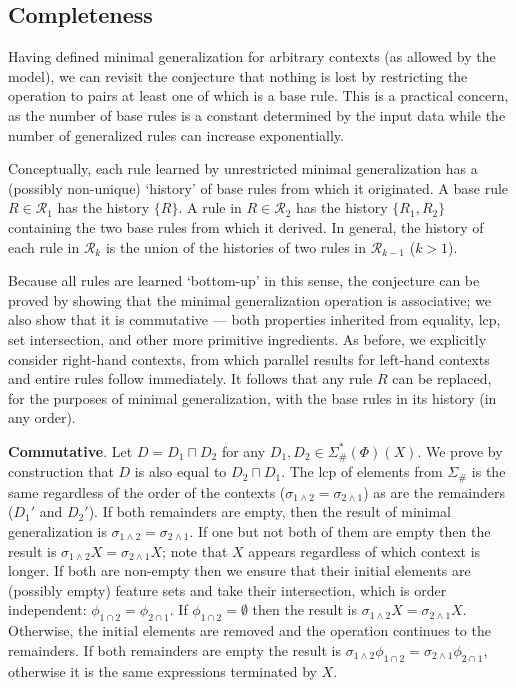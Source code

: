 \documentclass[11pt]{article}
\begin{document}
\subsection{Completeness}

Having defined minimal generalization for arbitrary contexts (as allowed by the model), we can revisit the conjecture that nothing is lost by restricting the operation to pairs at least one of which is a base rule. This is a practical concern, as the number of base rules is a constant determined by the input data while the number of generalized rules can increase exponentially.

Conceptually, each rule learned by unrestricted minimal generalization has a (possibly non-unique) `history' of base rules from which it originated. A base rule $R \in \mathcal{R}_1$ has the history $\{ R \}$. A rule in $R \in \mathcal{R}_2$ has the history $\{ R_1, R_2 \}$ containing the two base rules from which it derived. In general, the history of each rule in $\mathcal{R}_k$ is the union of the histories of two rules in $\mathcal{R}_{k-1}$ ($k > 1$).

Because all rules are learned `bottom-up' in this sense, the conjecture can be proved by showing that the minimal generalization operation is associative; we also show that it is commutative --- both properties inherited from equality, lcp, set intersection, and other more primitive ingredients. As before, we explicitly consider right-hand contexts, from which parallel results for left-hand contexts and entire rules follow immediately. It follows that any rule $R$ can be replaced, for the purposes of minimal generalization, with the base rules in its history (in any order). 

\textbf{Commutative}. Let $D = D_1 \sqcap D_2$ for any $D_1, D_2 \in \Sigma_{\#}^*(\Phi)(X)$. We prove by construction that $D$ is also equal to $D_2 \sqcap D_1$. The lcp of elements from $\Sigma_{\#}$ is the same regardless of the order of the contexts ($\sigma_{1\land 2} = \sigma_{2\land 1}$) as are the remainders ($D_1'$ and $D_2'$). If both remainders are empty, then the result of minimal generalization is $\sigma_{1\land 2} = \sigma_{2\land 1}$. If one but not both of them are empty then the result is $\sigma_{1\land 2}X = \sigma_{2\land 1}X$; note that $X$ appears regardless of which context is longer. If both are non-empty then we ensure that their initial elements are (possibly empty) feature sets and take their intersection, which is order independent: $\phi_{1\cap 2} = \phi_{2\cap 1}$. If $\phi_{1\cap 2} = \emptyset$ then the result is $\sigma_{1\land 2}X = \sigma_{2\land 1}X$. Otherwise, the initial elements are removed and the operation continues to the remainders. If both remainders are empty the result is $\sigma_{1\land 2}\phi_{1\cap 2} = \sigma_{2\land 1}\phi_{2\cap 1}$, otherwise it is the same expressions terminated by $X$.
\end{document}
